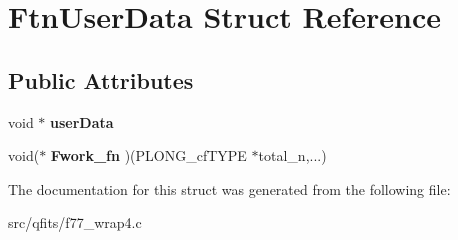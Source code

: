 \hypertarget{struct_ftn_user_data}{}\section{Ftn\+User\+Data Struct Reference}
\label{struct_ftn_user_data}
\subsection*{Public Attributes}
\begin{DoxyCompactItemize}
\item 
\mbox{\label{struct_ftn_user_data_a106ac4896253f32e4a8d920cb44bf304}} 
void $\ast$ {\bfseries user\+Data}
\item 
\mbox{\label{struct_ftn_user_data_a3b48a6d460d87762b3838b781ac2043a}} 
void($\ast$ {\bfseries Fwork\+\_\+fn} )(P\+L\+O\+N\+G\+\_\+cf\+T\+Y\+PE $\ast$total\+\_\+n,...)
\end{DoxyCompactItemize}


The documentation for this struct was generated from the following file\+:\begin{DoxyCompactItemize}
\item 
src/qfits/f77\+\_\+wrap4.\+c\end{DoxyCompactItemize}
